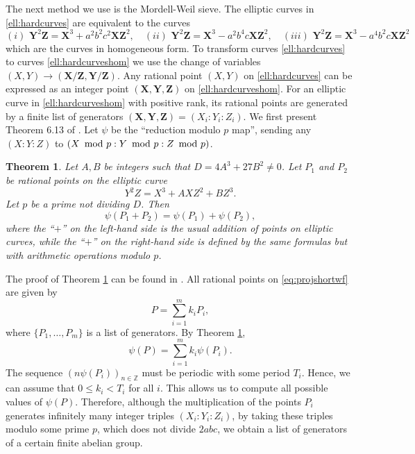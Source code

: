 \documentclass[a4paper,12pt,english,reqno]{amsart}
\newtheorem{theorem}{Theorem}
\newcommand{\Z}{{\mathbb Z}}
\begin{document}
The next method we use is the Mordell-Weil sieve. 
The elliptic curves in \eqref{ell:hardcurves} are equivalent to the curves 
\begin{equation}\label{ell:hardcurveshom}
(i) \,\, \mathbf{Y}^2\mathbf{Z}=\mathbf{X}^3+a^2b^2c^2\mathbf{X}\mathbf{Z}^2, \quad (ii) \,\, \mathbf{Y}^2\mathbf{Z}=\mathbf{X}^3-a^2b^4c\mathbf{X}\mathbf{Z}^2, \quad (iii) \,\, \mathbf{Y}^2\mathbf{Z}=\mathbf{X}^3-a^4b^2c\mathbf{X}\mathbf{Z}^2
\end{equation}
which are the curves in homogeneous form. To transform curves \eqref{ell:hardcurves} to curves \eqref{ell:hardcurveshom} we use the change of variables $(X,Y)\to (\mathbf{X/Z},\mathbf{Y/Z})$. Any rational point $(X,Y)$ on \eqref{ell:hardcurves} can be expressed as an integer point $(\mathbf{X},\mathbf{Y},\mathbf{Z})$ on \eqref{ell:hardcurveshom}. For an elliptic curve in \eqref{ell:hardcurveshom} with positive rank, its rational points are generated by
a finite list of generators $(\mathbf{X}, \mathbf{Y},\mathbf{Z}) = (X_i : Y_i : Z_i)$. 
We first present Theorem 6.13 of \cite{mainbook}. Let $\psi$ be the ``reduction modulo $p$
map'', sending any $(X : Y : Z)$ to $(X \text{\, mod\,\,} p : Y \text{\, mod\,\,} p : Z \text{\, mod\,\,} p)$.
\begin{theorem}\label{th:mwsieve}
Let $A,B$ be integers such that $D= 4A^3 + 27B^2 \neq 0$. Let $P_1$ and $P_2$ be rational points on the elliptic curve 
\begin{equation}\label{eq:projshortwf}
Y^2Z=X^3+AXZ^2+BZ^3.
\end{equation}
Let $p$ be a prime not dividing $D$. Then
$$
\psi(P_1 + P_2)= \psi(P_1) + \psi(P_2),
$$
where the “$+$” on the left-hand side is the usual addition of points on elliptic curves, while the “$+$” on the right-hand side is defined by the same formulas but with arithmetic operations modulo $p$.
\end{theorem}
The proof of Theorem \ref{th:mwsieve} can be found in \cite[Section A.5]{silverman1992rational}. All rational points on \eqref{eq:projshortwf} are given by
$$
P=\sum_{i=1}^m k_i P_i,
$$
where $\{P_1,\dots,P_m\}$ is a list of generators. By Theorem \ref{th:mwsieve},
$$
\psi(P)=\sum_{i=1}^m k_i \psi(P_i).
$$
The sequence $(n\psi(P_i))_{n\in \Z}$ must be periodic with some period $T_i$. Hence, we can assume that $0 \leq k_i <T_i$ for all $i$. This allows us to compute all possible values of $\psi(P)$. Therefore, although the multiplication of the points $P_i$ generates infinitely many integer triples $(X_i : Y_i : Z_i )$, by taking these triples modulo some prime $p$, which does not
divide $2abc$, we obtain a list of generators of a certain finite abelian group.
\end{document}
